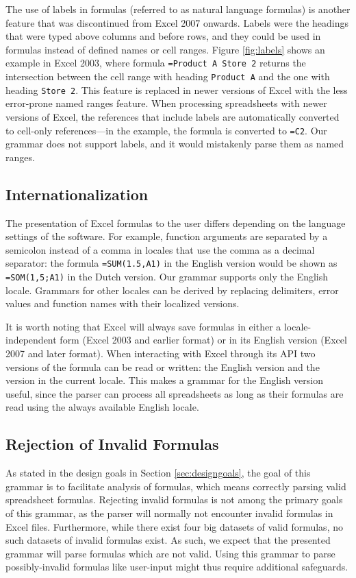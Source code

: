 \documentclass[times]{smrauth}
\begin{document}
The use of labels in formulas (referred to as natural language formulas) is another feature that was discontinued from Excel 2007 onwards.
Labels were the headings that were typed above columns and before rows, and they could be used in formulas instead of defined names or cell ranges.
Figure \ref{fig:labels} shows an example in Excel 2003, where formula \texttt{=Product A Store 2} returns the intersection between the cell range with heading \texttt{Product A} and the one with heading \texttt{Store 2}.
This feature is replaced in newer versions of Excel with the less error-prone named ranges feature.
When processing spreadsheets with newer versions of Excel, the references that include labels are automatically converted to cell-only references---in the example, the formula is converted to \texttt{=C2}.
Our grammar does not support labels, and it would mistakenly parse them as named ranges.

\subsection{Internationalization}

The presentation of Excel formulas to the user differs depending on the language settings of the software. For example, function arguments are separated by a semicolon instead of a comma in locales that use the comma as a decimal separator: the formula \texttt{=SUM(1.5,A1)} in the English version would be shown as \texttt{=SOM(1,5;A1)} in the Dutch version.
Our grammar supports only the English locale.
Grammars for other locales can be derived by replacing delimiters, error values and function names with their localized versions.

It is worth noting that Excel will always save formulas in either a locale-independent form (Excel 2003 and earlier format) or in its English version (Excel 2007 and later format). When interacting with Excel through its API two versions of the formula can be read or written: the English version and the version in the current locale.
This makes a grammar for the English version useful, since the parser can process all spreadsheets as long as their formulas are read using the always available English locale.

\subsection{Rejection of Invalid Formulas}

As stated in the design goals in Section \ref{sec:designgoals}, the goal of this grammar is to facilitate analysis of formulas, which means correctly parsing valid spreadsheet formulas.
Rejecting invalid formulas is not among the primary goals of this grammar, as the parser will normally not encounter invalid formulas in Excel files.
Furthermore, while there exist four big datasets of valid formulas, no such datasets of invalid formulas exist.
As such, we expect that the presented grammar will parse formulas which are not valid.
Using this grammar to parse possibly-invalid formulas like user-input might thus require additional safeguards.
\end{document}

